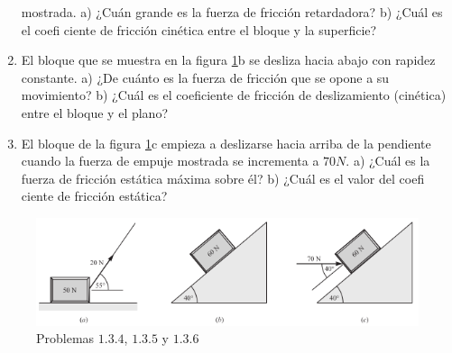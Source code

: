 \begin{enumerate}
mostrada. a) ¿Cuán grande es la fuerza de fricción retardadora? b) ¿Cuál es el coeﬁ ciente de fricción cinética
entre el bloque y la superﬁcie?
		\item El bloque que se muestra en la figura \ref{tresbloques}b se desliza hacia abajo con rapidez constante. a) ¿De cuánto es
la fuerza de fricción que se opone a su movimiento? b) ¿Cuál es el coeﬁciente de fricción de deslizamiento
(cinética) entre el bloque y el plano?
		\item El bloque de la figura \ref{tresbloques}c empieza a deslizarse hacia arriba de la pendiente cuando la fuerza de empuje
mostrada se incrementa a $70 N$. a) ¿Cuál es la fuerza de fricción estática máxima sobre él? b) ¿Cuál es el valor
del coeﬁ ciente de fricción estática?
	\end{enumerate}
		\begin{figure}[H]
			\centering
			\includegraphics[scale=0.6]{Images/tresbloques.png}
			\caption{Problemas $1.3.4$, $1.3.5$ y $1.3.6$}
			\label{tresbloques}
		\end{figure}


